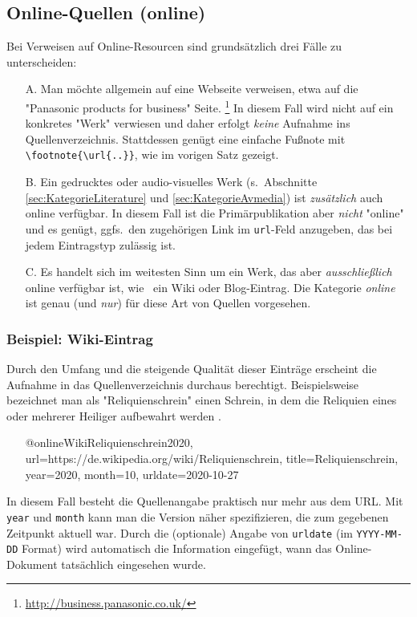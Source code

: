 \subsection{Online-Quellen (\textsf{online})}
\label{sec:KategorieOnline}

Bei Verweisen auf Online-Resourcen sind grundsätzlich drei Fälle zu unterscheiden:
%
\begin{itemize}
\item[A.] Man möchte allgemein auf eine Webseite verweisen, etwa auf die 
	"Panasonic products for business" Seite.%
	\footnote{\url{http://business.panasonic.co.uk/}}
	In diesem Fall wird nicht auf ein konkretes "Werk" verwiesen und daher
	erfolgt \emph{keine} Aufnahme ins Quellenverzeichnis. Stattdessen
	genügt eine einfache Fußnote mit \verb!\footnote{\url{..}}!, wie im vorigen
	Satz gezeigt.
\item[B.] Ein gedrucktes oder audio-visuelles Werk 
	(s.\ Abschnitte \ref{sec:KategorieLiterature} und \ref{sec:KategorieAvmedia})
	ist \emph{zusätzlich} auch online verfügbar. In diesem Fall ist die Primär\-publikation 
	aber \emph{nicht} "online" und es genügt, ggfs.\ den zugehörigen Link im 
	\texttt{url}-Feld anzugeben, das bei jedem Eintragstyp zulässig ist.
\item[C.] Es handelt sich im weitesten Sinn um ein Werk, das aber 
	\emph{ausschließlich} online verfügbar ist, wie \zB\ ein Wiki oder Blog-Eintrag.
	Die Kategorie \emph{online} ist genau (und \emph{nur}) für diese 
	Art von Quellen vorgesehen.
\end{itemize}


\subsubsection{Beispiel: Wiki-Eintrag}
\label{sec:@online-www}
Durch den Umfang und die steigende Qualität dieser Einträge erscheint
die Aufnahme in das Quellenverzeichnis durchaus berechtigt.
Beispielsweise bezeichnet man als "Reliquienschrein"
einen Schrein, in dem die Reliquien eines oder 
mehrerer Heiliger aufbewahrt werden \cite{WikiReliquienschrein2020}.
%
\begin{itemize}
\item[]
\begin{GenericCode}[numbers=none]
@online{WikiReliquienschrein2020,
  url={https://de.wikipedia.org/wiki/Reliquienschrein},
  title={Reliquienschrein},
  year={2020},
  month={10},
  urldate={2020-10-27}
}
\end{GenericCode}
\item[\cite{WikiReliquienschrein2020}] 
\end{itemize}
%
In diesem Fall besteht die Quellenangabe praktisch nur mehr aus dem URL.
Mit \texttt{year} und \texttt{month} kann man die Version näher spezifizieren, 
die zum gegebenen Zeitpunkt aktuell war.
Durch die (optionale) Angabe von \texttt{urldate} (im \texttt{YYYY-MM-DD} Format) wird automatisch 
die Information eingefügt, wann das Online-Dokument tatsächlich eingesehen wurde.




